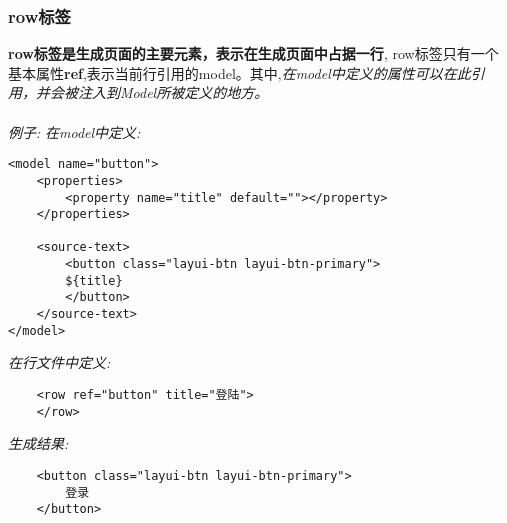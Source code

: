 \documentclass[UTF8]{ctexart}
\begin{document}
            \subsubsection{row标签}
                \par\textbf{row标签是生成页面的主要元素，表示在生成页面中占据一行},
                row标签只有一个基本属性\textbf{ref},表示当前行引用的model。其中,\emph{在model中定义的属性可以在此引用，并会被注入到Model所被定义的地方。}
                \\
                \\
                \newpage
                \emph{例子:}
                \emph{
                    在model中定义:
                }
\small\begin{lstlisting}
<model name="button">
    <properties>
        <property name="title" default=""></property>
    </properties>

    <source-text>
        <button class="layui-btn layui-btn-primary">
        ${title}
        </button>
    </source-text>
</model>
\end{lstlisting} 

            \emph{在行文件中定义:}
\small\begin{lstlisting}
    <row ref="button" title="登陆">
    </row>
\end{lstlisting}       
\emph{生成结果:}
\small\begin{lstlisting}
    <button class="layui-btn layui-btn-primary">
        登录
    </button>
\end{lstlisting}       



                
\end{document}
